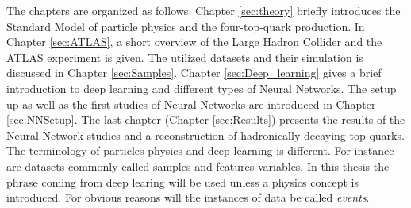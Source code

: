 The chapters are organized as follows: Chapter \ref{sec:theory} briefly introduces the Standard Model of particle physics and the four-top-quark production. In Chapter \ref{sec:ATLAS}, a short overview of the Large Hadron Collider and the ATLAS experiment is given. The utilized datasets and their simulation is discussed in Chapter \ref{sec:Samples}. Chapter \ref{sec:Deep_learning} gives a brief introduction to deep learning and different types of Neural Networks. The setup up as well as the first studies of Neural Networks are introduced in Chapter \ref{sec:NNSetup}. The last chapter (Chapter \ref{sec:Results}) presents the results of the Neural Network studies and a reconstruction of hadronically decaying top quarks. \\
The terminology of particles physics and deep learning is different. For instance are datasets commonly called samples and features variables. In this thesis the phrase coming from deep learing will be used unless a physics concept is introduced. For obvious reasons will the instances of data be called \textit{events}.

